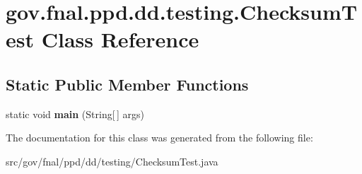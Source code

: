 \hypertarget{classgov_1_1fnal_1_1ppd_1_1dd_1_1testing_1_1ChecksumTest}{\section{gov.\-fnal.\-ppd.\-dd.\-testing.\-Checksum\-Test Class Reference}
\label{classgov_1_1fnal_1_1ppd_1_1dd_1_1testing_1_1ChecksumTest}
}
\subsection*{Static Public Member Functions}
\begin{DoxyCompactItemize}
\item 
\hypertarget{classgov_1_1fnal_1_1ppd_1_1dd_1_1testing_1_1ChecksumTest_a40ba7aba88006cf33ed0658509f84c16}{static void {\bfseries main} (String\mbox{[}$\,$\mbox{]} args)}\label{classgov_1_1fnal_1_1ppd_1_1dd_1_1testing_1_1ChecksumTest_a40ba7aba88006cf33ed0658509f84c16}

\end{DoxyCompactItemize}


The documentation for this class was generated from the following file\-:\begin{DoxyCompactItemize}
\item 
src/gov/fnal/ppd/dd/testing/Checksum\-Test.\-java\end{DoxyCompactItemize}
